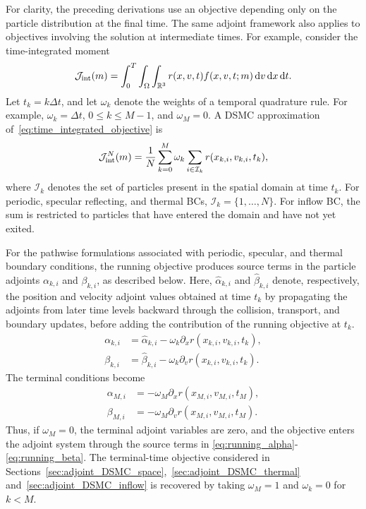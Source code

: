 \documentclass[12pt,nopreprintline]{elsarticle}
\begin{document}
{For clarity, the preceding derivations use an objective depending only on the particle distribution at the final time. The same adjoint framework also applies to objectives involving the solution at intermediate times. For example, consider the time-integrated moment
\begin{equation}
\label{eq:time_integrated_objective}
\mathcal J_{\rm int}(m)
=
\int_0^T
\int_{\Omega}
\int_{\mathbb R^3}
r(x,v,t)f(x,v,t;m)
\,\mathrm{d}v\,\mathrm{d}x\,\mathrm{d}t .
\end{equation}
Let $t_k=k\Delta t$, and let $\omega_k$ denote the weights of a temporal quadrature rule. For example, $
\omega_k=\Delta t$, $0\leq k\leq M-1$, and $\omega_M=0$.
A DSMC approximation of~\eqref{eq:time_integrated_objective} is
\begin{equation}
\label{eq:time_integrated_objective_DSMC}
\mathcal J_{\rm int}^N(m)
=
\frac{1}{N}
\sum_{k=0}^{M}
\omega_k
\sum_{i\in\mathcal I_k}
r(x_{k,i},v_{k,i},t_k),
\end{equation}
where $\mathcal I_k$ denotes the set of particles present in the spatial domain at time $t_k$. For periodic, specular reflecting, and thermal BCs, $\mathcal I_k=\{1,\ldots,N\}$. For inflow BC, the sum is restricted to particles that have entered the domain and have not yet exited.

For the pathwise formulations associated with periodic, specular, and thermal boundary conditions, the running objective produces source terms in the particle adjoints $\alpha_{k,i}$ and $\beta_{k,i}$, as described below. Here, $\widehat\alpha_{k,i}$ and $\widehat\beta_{k,i}$ denote, respectively, the position and velocity adjoint values obtained at time $t_k$ by propagating the adjoints from later time levels backward through the collision, transport, and boundary updates, before adding the contribution of the running objective at $t_k$.
\begin{align}
\alpha_{k,i}
&=
\widehat\alpha_{k,i}
-
\omega_k
\partial_x r(x_{k,i},v_{k,i},t_k),
\label{eq:running_alpha}
\\
\beta_{k,i}
&=
\widehat\beta_{k,i}
-
\omega_k
\partial_v r(x_{k,i},v_{k,i},t_k).
\label{eq:running_beta}
\end{align}
The terminal conditions become
\begin{align}
\alpha_{M,i}
&=
-\omega_M
\partial_x r(x_{M,i},v_{M,i},t_M),
\\
\beta_{M,i}
&=
-\omega_M
\partial_v r(x_{M,i},v_{M,i},t_M).
\end{align}
Thus, if $\omega_M=0$, the terminal adjoint variables are zero, and the objective enters the adjoint system through the source terms in \eqref{eq:running_alpha}-\eqref{eq:running_beta}. The terminal-time objective considered in Sections~\ref{sec:adjoint_DSMC_space},~\ref{sec:adjoint_DSMC_thermal} and~\ref{sec:adjoint_DSMC_inflow} is recovered by taking $\omega_M=1$ and $\omega_k=0$ for $k<M$.

}
\end{document}
